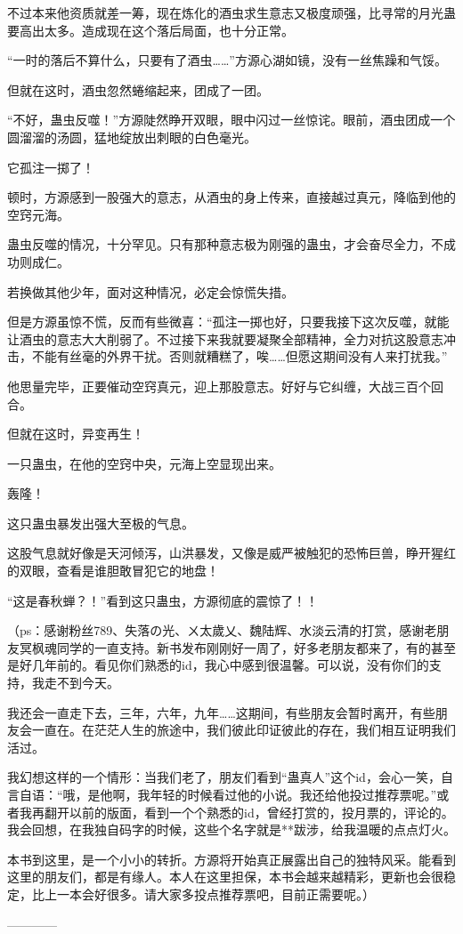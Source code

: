 \begin{this_body}
不过本来他资质就差一筹，现在炼化的酒虫求生意志又极度顽强，比寻常的月光蛊要高出太多。造成现在这个落后局面，也十分正常。

“一时的落后不算什么，只要有了酒虫……”方源心湖如镜，没有一丝焦躁和气馁。

但就在这时，酒虫忽然蜷缩起来，团成了一团。

“不好，蛊虫反噬！”方源陡然睁开双眼，眼中闪过一丝惊诧。眼前，酒虫团成一个圆溜溜的汤圆，猛地绽放出刺眼的白色毫光。

它孤注一掷了！

顿时，方源感到一股强大的意志，从酒虫的身上传来，直接越过真元，降临到他的空窍元海。

蛊虫反噬的情况，十分罕见。只有那种意志极为刚强的蛊虫，才会奋尽全力，不成功则成仁。

若换做其他少年，面对这种情况，必定会惊慌失措。

但是方源虽惊不慌，反而有些微喜：“孤注一掷也好，只要我接下这次反噬，就能让酒虫的意志大大削弱了。不过接下来我就要凝聚全部精神，全力对抗这股意志冲击，不能有丝毫的外界干扰。否则就糟糕了，唉……但愿这期间没有人来打扰我。”

他思量完毕，正要催动空窍真元，迎上那股意志。好好与它纠缠，大战三百个回合。

但就在这时，异变再生！

一只蛊虫，在他的空窍中央，元海上空显现出来。

轰隆！

这只蛊虫暴发出强大至极的气息。

这股气息就好像是天河倾泻，山洪暴发，又像是威严被触犯的恐怖巨兽，睁开猩红的双眼，查看是谁胆敢冒犯它的地盘！

“这是春秋蝉？！”看到这只蛊虫，方源彻底的震惊了！！

（ps：感谢粉丝789、失落の光、ㄨ太歲乂、魏陆辉、水淡云清的打赏，感谢老朋友冥枫魂同学的一直支持。新书发布刚刚好一周了，好多老朋友都来了，有的甚至是好几年前的。看见你们熟悉的id，我心中感到很温馨。可以说，没有你们的支持，我走不到今天。

我还会一直走下去，三年，六年，九年……这期间，有些朋友会暂时离开，有些朋友会一直在。在茫茫人生的旅途中，我们彼此印证彼此的存在，我们相互证明我们活过。

我幻想这样的一个情形：当我们老了，朋友们看到“蛊真人”这个id，会心一笑，自言自语：“哦，是他啊，我年轻的时候看过他的小说。我还给他投过推荐票呢。”或者我再翻开以前的版面，看到一个个熟悉的id，曾经打赏的，投月票的，评论的。我会回想，在我独自码字的时候，这些个名字就是**跋涉，给我温暖的点点灯火。

本书到这里，是一个小小的转折。方源将开始真正展露出自己的独特风采。能看到这里的朋友们，都是有缘人。本人在这里担保，本书会越来越精彩，更新也会很稳定，比上一本会好很多。请大家多投点推荐票吧，目前正需要呢。）

------------

\end{this_body}

